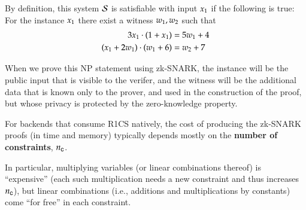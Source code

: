 By definition, this system $\mathcal{S}$ is satisfiable with input $x_1$ if the following is true:
\NPstatementNOperiod
  {For the instance $x_1$}
  {there exist a witness $w_1,w_2$}
  {such that
  \begin{equation*}
  \begin{aligned}
  3x_1 \cdot (1+x_1) &= 5w_1 + 4 \\
  (x_1 + 2w_1) \cdot (w_1+6) &= w_2 + 7  
  \end{aligned}
  \end{equation*}
  }

When we prove this NP statement using zk-SNARK, the instance will be the public input that is visible to the verifer, and the witness will be the additional data that is known only to the prover, and used in the construction of the proof, but whose privacy is protected by the zero-knowledge property.

For backends that consume R1CS natively, the cost of producing the zk-SNARK proofs (in time and memory) typically depends mostly on the \textbf{number of constraints}, $n_{\mathsf{c}}$.

In particular, multiplying variables (or linear combinations thereof) is ``expensive'' (each such multiplication needs a new constraint and thus increases $n_{\mathsf{c}}$), but linear combinations (i.e., additions and multiplications by constants) come ``for free'' in each constraint. 
